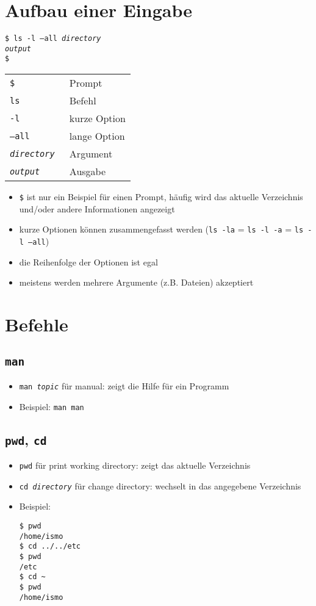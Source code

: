 \section{Aufbau einer Eingabe}
\texttt{\$ ls -l --all \textit{directory}\\
        \textit{output}\\
        \$}
\begin{center}
  \begin{tabular}{>{\tt}l l}
    \toprule
    \$                 & Prompt       \\
    ls                 & Befehl       \\
    -l                 & kurze Option \\
    --all              & lange Option \\
    \textit{directory} & Argument     \\
    \textit{output}    & Ausgabe      \\
    \bottomrule
  \end{tabular}
\end{center}
\begin{itemize}
  \item \texttt{\$} ist nur ein Beispiel für einen Prompt, häufig wird das aktuelle Verzeichnis und/oder andere Informationen angezeigt
  \item kurze Optionen können zusammengefasst werden (\texttt{ls~-la} = \texttt{ls -l -a} = \texttt{ls -l --all})
  \item die Reihenfolge der Optionen ist egal
  \item meistens werden mehrere Argumente (z.B. Dateien) akzeptiert
\end{itemize}

\section{Befehle}
\subsection{\texttt{man}}
\begin{itemize}
  \item \texttt{man \textit{topic}} für manual: zeigt die Hilfe für ein Programm
  \item Beispiel: \texttt{man man}
\end{itemize}

\subsection{\texttt{pwd}, \texttt{cd}}
\begin{itemize}
  \item \texttt{pwd} für print working directory: zeigt das aktuelle Verzeichnis
  \item \texttt{cd \textit{directory}} für change directory: wechselt in das angegebene Verzeichnis
  \item Beispiel:
\begin{verbatim}
$ pwd
/home/ismo
$ cd ../../etc
$ pwd
/etc
$ cd ~
$ pwd
/home/ismo
\end{verbatim}
\end{itemize}

